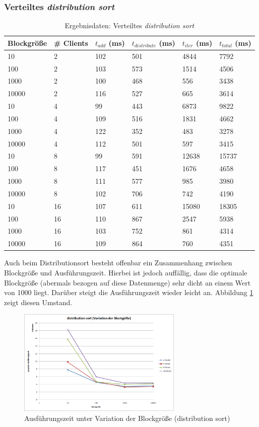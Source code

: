 \documentclass[fontsize=12pt,a4paper,headinclude=no,headings=small]{scrartcl}
\begin{document}
\subsubsection{Verteiltes \textit{distribution sort}}
\begin{table}[H]
\begin{tabularx}{\textwidth}{ |X|X|X|X|X|X| }
\hline
Blockgröße & \# Clients & $t_{add}$ (ms) & $t_{distribute}$ (ms) & $t_{iter}$ (ms) & $t_{total}$ (ms) \\
\hline
10 & 2 & 102 & 501 & 4844 & 7792 \\
100 & 2 & 103 & 573 & 1514 & 4506 \\
1000 & 2 & 100 & 468 & 556 & 3438 \\
10000 & 2 & 116 & 527 & 665 & 3614 \\
\hline
10 & 4 & 99 & 443 & 6873 & 9822 \\ 
100 & 4 & 109 & 516 & 1831 & 4662 \\ 
1000 & 4 & 122 & 352 & 483 & 3278 \\ 
10000 & 4 & 112 & 501 & 597 & 3415 \\
\hline
10 & 8 & 99 & 591 & 12638 & 15737 \\
100 & 8 & 117 & 451 & 1676 & 4658 \\
1000 & 8 & 111 & 577 & 985 & 3980 \\
10000 & 8 & 102 & 706 & 742 & 4190 \\
\hline
10 & 16 & 107 & 611 & 15080 & 18305 \\
100 & 16 & 110 & 867 & 2547 & 5938 \\
1000 & 16 & 103 & 752 & 861 & 4314 \\
10000 & 16 & 109 & 864 & 760 & 4351 \\
\hline
\end{tabularx}
\caption{Ergebnisdaten: Verteiltes \textit{distribution sort}}
\end{table}
Auch beim Distributionsort besteht offenbar ein Zusammenhang zwischen Blockgröße und Ausführungszeit. Hierbei ist jedoch auffällig, dass die optimale Blockgröße (abermals bezogen auf diese Datenmenge) sehr dicht an einem Wert von 1000 liegt. Darüber steigt die Ausführungszeit wieder leicht an. Abbildung \ref{fig.ds.compare.blocksize} zeigt diesen Umstand.

\begin{figure}[H]
	\centering
	\includegraphics[width=0.7\textwidth]{results/sort/diagrams/block_ds.png}
	\caption{Ausführungszeit unter Variation der Blockgröße (distribution sort)}
	\label{fig.ds.compare.blocksize}
\end{figure}
\end{document}
